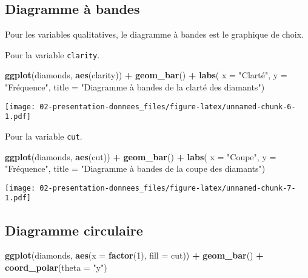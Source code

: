 \documentclass[]{book}
\newenvironment{Shaded}{\begin{snugshade}}{\end{snugshade}}
\newcommand{\KeywordTok}[1]{\textcolor[rgb]{0.13,0.29,0.53}{\textbf{#1}}}
\newcommand{\DataTypeTok}[1]{\textcolor[rgb]{0.13,0.29,0.53}{#1}}
\newcommand{\DecValTok}[1]{\textcolor[rgb]{0.00,0.00,0.81}{#1}}
\newcommand{\StringTok}[1]{\textcolor[rgb]{0.31,0.60,0.02}{#1}}
\newcommand{\OperatorTok}[1]{\textcolor[rgb]{0.81,0.36,0.00}{\textbf{#1}}}
\newcommand{\NormalTok}[1]{#1}
\begin{document}
\subsection{Diagramme à bandes}\label{diagramme-a-bandes}

Pour les variables qualitatives, le diagramme à bandes est le graphique
de choix.

Pour la variable \texttt{clarity}.

\begin{Shaded}
\begin{Highlighting}[]
\KeywordTok{ggplot}\NormalTok{(diamonds, }\KeywordTok{aes}\NormalTok{(clarity)) }\OperatorTok{+}\StringTok{ }\KeywordTok{geom_bar}\NormalTok{() }\OperatorTok{+}
\StringTok{  }\KeywordTok{labs}\NormalTok{(}
    \DataTypeTok{x =} \StringTok{"Clarté"}\NormalTok{, }
    \DataTypeTok{y =} \StringTok{"Fréquence"}\NormalTok{, }
    \DataTypeTok{title =} \StringTok{"Diagramme à bandes de la clarté des diamants"}\NormalTok{)}
\end{Highlighting}
\end{Shaded}

\texttt{[image: 02-presentation-donnees\_files/figure-latex/unnamed-chunk-6-1.pdf]}

Pour la variable \texttt{cut}.

\begin{Shaded}
\begin{Highlighting}[]
\KeywordTok{ggplot}\NormalTok{(diamonds, }\KeywordTok{aes}\NormalTok{(cut)) }\OperatorTok{+}\StringTok{ }\KeywordTok{geom_bar}\NormalTok{() }\OperatorTok{+}
\StringTok{  }\KeywordTok{labs}\NormalTok{(}
    \DataTypeTok{x =} \StringTok{"Coupe"}\NormalTok{, }
    \DataTypeTok{y =} \StringTok{"Fréquence"}\NormalTok{, }
    \DataTypeTok{title =} \StringTok{"Diagramme à bandes de la coupe des diamants"}\NormalTok{)}
\end{Highlighting}
\end{Shaded}

\texttt{[image: 02-presentation-donnees\_files/figure-latex/unnamed-chunk-7-1.pdf]}

\subsection{Diagramme circulaire}\label{diagramme-circulaire}

\begin{Shaded}
\begin{Highlighting}[]
\KeywordTok{ggplot}\NormalTok{(diamonds, }\KeywordTok{aes}\NormalTok{(}\DataTypeTok{x =} \KeywordTok{factor}\NormalTok{(}\DecValTok{1}\NormalTok{), }\DataTypeTok{fill =}\NormalTok{ cut)) }\OperatorTok{+}\StringTok{ }
\StringTok{  }\KeywordTok{geom_bar}\NormalTok{() }\OperatorTok{+}
\StringTok{  }\KeywordTok{coord_polar}\NormalTok{(}\DataTypeTok{theta =} \StringTok{"y"}\NormalTok{)}
\end{Highlighting}
\end{Shaded}
\end{document}
